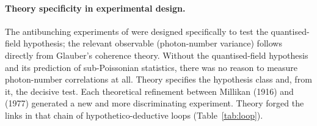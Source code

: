 \documentclass[12pt]{article}
\begin{document}
\paragraph{Theory specificity in experimental design.}
The antibunching experiments of \citet{Kimble1977} were designed
specifically to test the quantised-field hypothesis; the relevant
observable (photon-number variance) follows directly from
Glauber's coherence theory.  Without the quantised-field hypothesis and
its prediction of sub-Poissonian statistics, there was no reason to
measure photon-number correlations at all.  Theory specifies the hypothesis
class and, from it, the decisive test.  Each theoretical refinement between
Millikan (1916) and \citeauthor{Kimble1977} (1977) generated a new and more
discriminating experiment.  Theory forged the links in that chain of
hypothetico-deductive loops (Table~\ref{tab:loop}).

\bigskip


\end{document}
